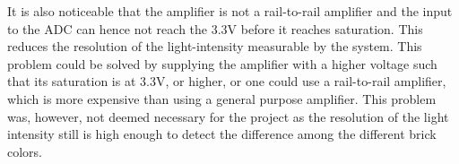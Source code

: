 It is also noticeable that the amplifier is not a rail-to-rail amplifier and the input to the ADC can hence not reach the 3.3V before it reaches saturation.
This reduces the resolution of the light-intensity measurable by the system.
This problem could be solved by supplying the amplifier with a higher voltage such that its saturation is at 3.3V, or higher, or one could use a rail-to-rail amplifier, which is more expensive than using a general purpose amplifier.
This problem was, however, not deemed necessary for the project as the resolution of the light intensity still is high enough to detect the difference among the different brick colors.




